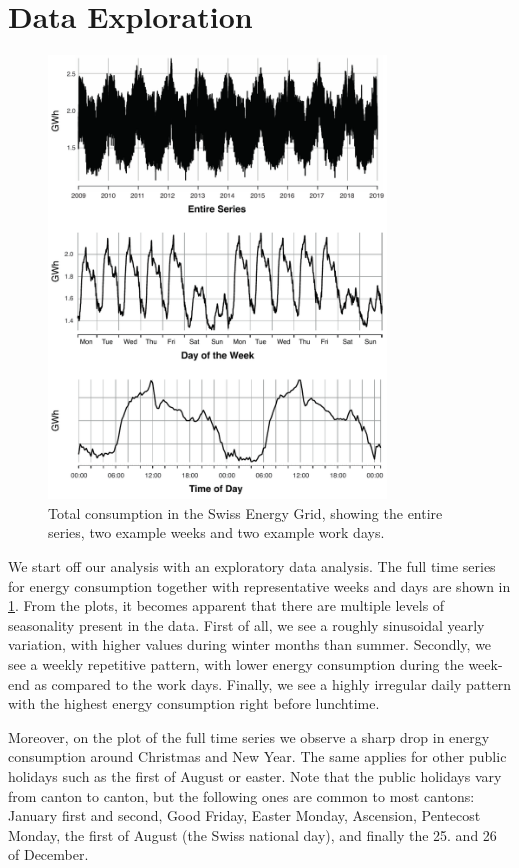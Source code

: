 \documentclass[conference]{IEEEtran}
\begin{document}
\section{Data Exploration}
\begin{figure}[ht]
	\centering
	\includegraphics[width=0.8\textwidth]{Figs/Fig1.pdf}
	\caption{Total consumption in the Swiss Energy Grid, showing the entire series, two example weeks and two example work days.}
	\label{SeriesPlot}
\end{figure}
We start off our analysis with an exploratory data analysis. The full time series for energy consumption together with representative weeks and days are shown in \ref{SeriesPlot}. From the plots, it becomes apparent that there are multiple levels of seasonality present in the data. First of all, we see a roughly sinusoidal yearly variation, with higher values during winter months than summer. Secondly, we see a weekly repetitive pattern, with lower energy consumption during the week-end as compared to the work days. Finally, we see a highly irregular daily pattern with the highest energy consumption right before lunchtime.
\par
Moreover, on the plot of the full time series we observe a sharp drop in energy consumption around Christmas and New Year. The same applies for other public holidays such as the first of August or  easter. Note that the public holidays vary from canton to canton, but the following ones are common to most cantons: January first and second, Good Friday, Easter Monday, Ascension, Pentecost Monday, the first of August (the Swiss national day), and finally the 25. and 26 of December. 
\par
\end{document}
